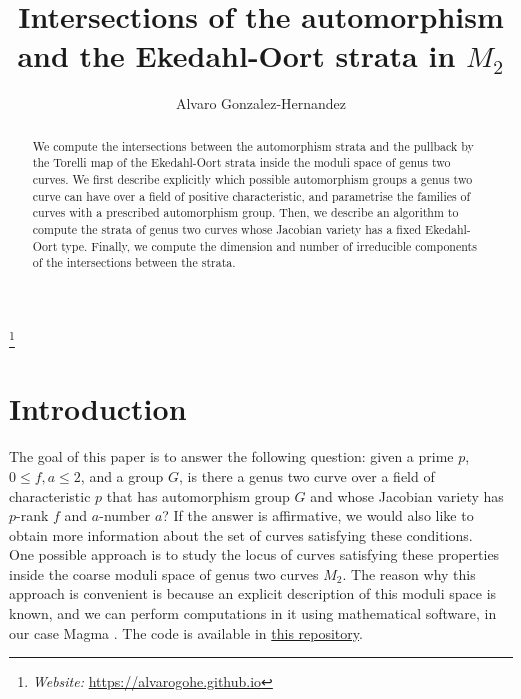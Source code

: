 \documentclass{amsart}
\numberwithin{equation}{section}
\theoremstyle{definition}
\theoremstyle{remark}
\begin{document}
\begin{abstract}
We compute the intersections between the automorphism strata and the pullback by the Torelli map of the Ekedahl-Oort strata inside the moduli space of genus two curves. We first describe explicitly which possible automorphism groups a genus two curve can have over a field of positive characteristic, and parametrise the families of curves with a prescribed automorphism group. Then, we describe an algorithm to compute the strata of genus two curves whose Jacobian variety has a fixed Ekedahl-Oort type. Finally, we compute the dimension and number of irreducible components of the intersections between the strata.
\end{abstract}



\title{Intersections of the automorphism and the Ekedahl-Oort strata in $M_2$}

\author{Alvaro Gonzalez-Hernandez}

\address{Mathematics Institute\\
    University of Warwick\\
    CV4 7AL \\
    United Kingdom\\}



\thanks{\emph{Website:} \url{https://alvarogohe.github.io}}
\maketitle


\section{Introduction}
The goal of this paper is to answer the following question: given a prime $p$, $0\leq f,a\leq 2$, and a group $G$, is there a genus two curve over a field of characteristic $p$ that has automorphism group $G$ and whose Jacobian variety has $p$-rank $f$ and $a$-number $a$? If the answer is affirmative, we would also like to obtain more information about the set of curves satisfying these conditions.\\

One possible approach is to study the locus of curves satisfying these properties inside the coarse moduli space of genus two curves $M_2$. The reason why this approach is convenient is because an explicit description of this moduli space is known, and we can perform computations in it using mathematical software, in our case Magma \cite{Bosma1997TheLanguage}. The code is available in \href{https://github.com/AlvaroGohe/Intersections-of-strata-in-the-moduli-space-of-genus-2-curves}{this repository}.\\
\end{document}
